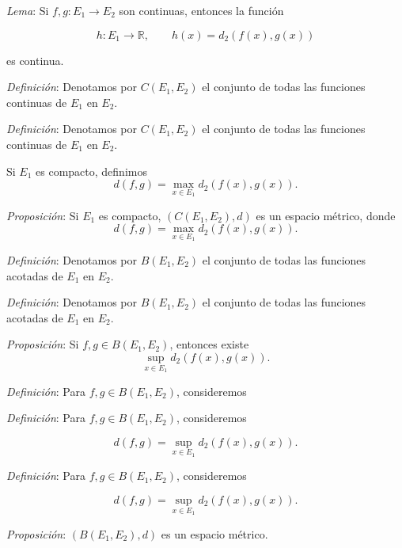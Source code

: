 \documentclass{beamer}
\begin{document}
  \begin{frame}
    \textit{Lema}: Si $f,g:E_1\to E_2$ son continuas, entonces la función

    \[h:E_1\to\mathbb{R},\qquad h(x)=d_2(f(x),g(x))\]

    es continua.
  \end{frame}

  \begin{frame}
    \textit{Definición}: Denotamos por $C(E_1,E_2)$ el conjunto de todas las funciones continuas de $E_1$ en $E_2$.
  \end{frame}

  \begin{frame}
    \textit{Definición}: Denotamos por $C(E_1,E_2)$ el conjunto de todas las funciones continuas de $E_1$ en $E_2$.

    Si $E_1$ es compacto, definimos
    \[d(f,g)=\max_{x\in E_1}d_2(f(x),g(x)).\]
  \end{frame}

  \begin{frame}
    \textit{Proposición}: Si $E_1$ es compacto, $(C(E_1,E_2),d)$ es un espacio métrico, donde
    \[d(f,g)=\max_{x\in E_1}d_2(f(x),g(x)).\]
  \end{frame}

  \begin{frame}
    \textit{Definición}: Denotamos por $B(E_1,E_2)$ el conjunto de todas las funciones acotadas de $E_1$ en $E_2$.
  \end{frame}

  \begin{frame}
    \textit{Definición}: Denotamos por $B(E_1,E_2)$ el conjunto de todas las funciones acotadas de $E_1$ en $E_2$.

    \textit{Proposición}: Si $f,g\in B(E_1,E_2)$, entonces existe
    \[\sup_{x\in E_1}d_2(f(x),g(x)).\]
  \end{frame}

  \begin{frame}
    \textit{Definición}: Para $f,g\in B(E_1,E_2)$, consideremos
  \end{frame}

  \begin{frame}
    \textit{Definición}: Para $f,g\in B(E_1,E_2)$, consideremos

    \[d(f,g)=\sup_{x\in E_1}d_2(f(x),g(x)).\]
  \end{frame}

  \begin{frame}
    \textit{Definición}: Para $f,g\in B(E_1,E_2)$, consideremos

    \[d(f,g)=\sup_{x\in E_1}d_2(f(x),g(x)).\]

    \textit{Proposición}: $(B(E_1,E_2),d)$ es un espacio métrico.
  \end{frame}
\end{document}
